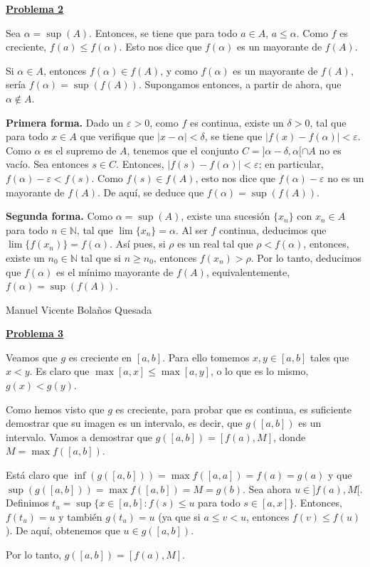 \documentclass[10pt,a4paper]{article}
\begin{document}
	\begin{flushleft}
		\textbf{\underline{Problema 2}}
	\end{flushleft}
	
	Sea $\alpha = \sup (A)$. Entonces, se tiene que para todo $a \in A$, $a \leq \alpha$. Como $f$ es creciente, $f(a) \leq f(\alpha)$. Esto nos dice que $f(\alpha)$ es un mayorante de $f(A)$.
	
	Si $\alpha \in A$, entonces $f(\alpha) \in f(A)$, y como $f(\alpha)$ es un mayorante de $f(A)$, sería $f(\alpha) = \sup (f(A))$. Supongamos entonces, a partir de ahora, que $\alpha \notin A$. \newline
	
	\textbf{Primera forma. }Dado un $\varepsilon > 0$, como $f$ es continua, existe un $\delta > 0$, tal que para todo $x \in A$ que verifique que $|x - \alpha| < \delta$, se tiene que $|f(x) - f(\alpha)| < \varepsilon$. Como $\alpha$ es el supremo de $A$, tenemos que el conjunto $C = ]\alpha - \delta, \alpha[ \cap A$ no es vacío. Sea entonces $s \in C$. Entonces, $|f(s) - f(\alpha)| < \varepsilon$; en particular, $f(\alpha) - \varepsilon < f(s)$. Como $f(s) \in f(A)$, esto nos dice que $f(\alpha) - \varepsilon$ no es un mayorante de $f(A)$. De aquí, se deduce que $f(\alpha) = \sup(f(A))$. \newline
	
	\textbf{Segunda forma. }Como $\alpha = \sup (A)$, existe una sucesión $\{x_n\}$ con $x_n \in A$ para todo $n \in \mathbb{N}$, tal que $\lim \{x_n\} = \alpha$. Al ser $f$ continua, deducimos que $\lim \{f(x_n)\} = f(\alpha)$. Así pues, si $\rho$ es un real tal que $\rho < f(\alpha)$, entonces, existe un $n_0 \in \mathbb{N}$ tal que si $n \geq n_0$, entonces $f(x_n) > \rho$. Por lo tanto, deducimos que $f(\alpha)$ es el mínimo mayorante de $f(A)$, equivalentemente, $f(\alpha) = \sup (f(A))$. 
	
	\newpage 
	Manuel Vicente Bolaños Quesada
	
	\begin{flushleft}
		\textbf{\underline{Problema 3}}
	\end{flushleft}
	
	Veamos que $g$ es creciente en $[a, b]$. Para ello tomemos $x, y \in [a, b]$ tales que $x < y$. Es claro que $\max[a, x] \leq \max[a, y]$, o lo que es lo mismo, $g(x) < g(y)$.
	
	Como hemos visto que $g$ es creciente, para probar que es continua, es suficiente demostrar que su imagen es un intervalo, es decir, que $g([a, b])$ es un intervalo. Vamos a demostrar que $g([a, b]) = [f(a), M]$, donde $M = \max f([a, b])$.
	
	Está claro que $\inf(g([a, b])) = \max f([a, a]) = f(a) = g(a)$ y que $\sup(g([a, b])) = \max f([a, b]) =  M = g(b)$. Sea ahora $u \in ]f(a), M[$. Definimos $t_u = \sup \{x \in [a, b] : f(s) \leq u $ para todo $s \in [a, x]\}$. Entonces, $f(t_u) = u$ y también $g(t_u) = u$ (ya que si $ a \leq v < u$, entonces $f(v) \leq f(u)$). De aquí, obtenemos que $u \in g([a, b])$.
	
	Por lo tanto, $g([a, b]) = [f(a), M]$.
	
\end{document}
